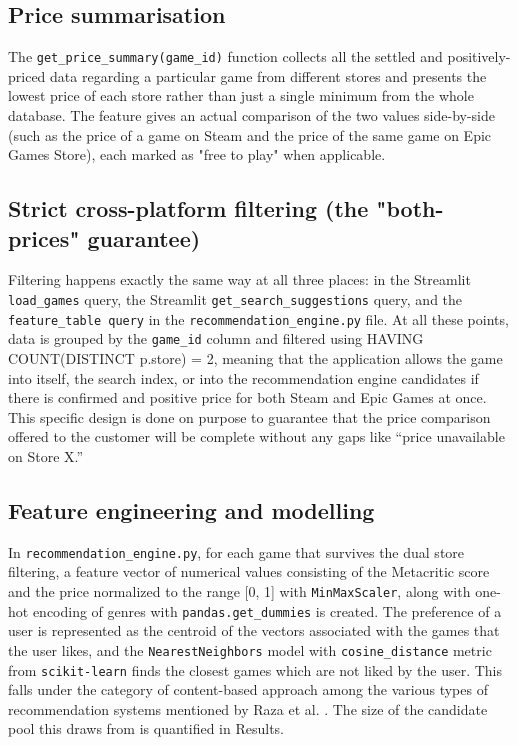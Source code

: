 \documentclass[fleqn,10pt]{wlscirep}
\begin{document}
\subsection*{Price summarisation}

The \texttt{get\_price\_summary(game\_id)} function collects all the settled and positively-priced data regarding a particular game from different stores and presents the lowest price of each store rather than just a single minimum from the whole database. The feature gives an actual comparison of the two values side-by-side (such as the price of a game on Steam and the price of the same game on Epic Games Store), each marked as "free to play" when applicable.

\subsection*{Strict cross-platform filtering (the "both-prices" guarantee)}

Filtering happens exactly the same way at all three places: in the Streamlit \texttt{load\_games} query, the Streamlit \texttt{get\_search\_suggestions} query, and the \texttt{feature\_table query} in the \texttt{recommendation\_engine.py} file. At all these points, data is grouped by the \texttt{game\_id} column and filtered using HAVING COUNT(DISTINCT p.store) = 2, meaning that the application allows the game into itself, the search index, or into the recommendation engine candidates if there is confirmed and positive price for both Steam and Epic Games at once. This specific design is done on purpose to guarantee that the price comparison offered to the customer will be complete without any gaps like “price unavailable on Store X.”

\subsection*{Feature engineering and modelling}

In \texttt{recommendation\_engine.py}, for each game that survives the dual store filtering, a feature vector of numerical values consisting of the Metacritic score and the price normalized to the range [0, 1] with \texttt{MinMaxScaler}, along with one-hot encoding of genres with \texttt{pandas.get\_dummies}\cite{McKinney:pandas:2010} is created. The preference of a user is represented as the centroid of the vectors associated with the games that the user likes, and the \texttt{NearestNeighbors} model with \texttt{cosine\_distance} metric from \texttt{scikit-learn}\cite{Pedregosa:sklearn:2011} finds the closest games which are not liked by the user. This falls under the category of content-based approach among the various types of recommendation systems mentioned by Raza et al. \cite{Raza:recsys:2024}. The size of the candidate pool this draws from is quantified in Results.
\end{document}
